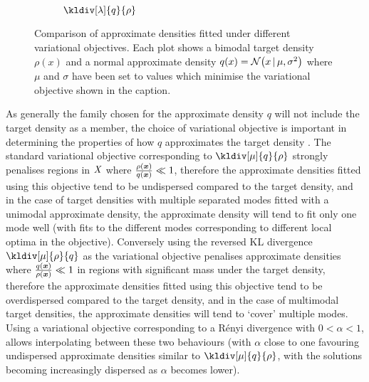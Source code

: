 \begin{figure}[t]
\begin{subfigure}[b]{.32\linewidth}
\caption{$\kldiv[\lambda]{q}{\rho}$}
\label{sfig:var-obj-kl-qp}
\end{subfigure}
\caption[Variational objective comparison.]{Comparison of approximate densities fitted under different variational objectives. Each plot shows a bimodal target density $\rho(x)$ and a normal approximate density $q(x) = \nrm{x \gvn \mu,\sigma^2}$ where $\mu$ and $\sigma$ have been set to values which minimise the variational objective shown in the caption.}
\label{fig:variational-objective-comparison}
\end{figure}

As generally the family chosen for the approximate density $q$ will not include the target density as a member, the choice of variational objective is important in determining the properties of how $q$ approximates the target density \citep{bishop2006pattern}. The standard variational objective corresponding to $\kldiv[\mu]{q}{\rho}$ strongly penalises regions in $\mathit{X}$ where $\frac{\rho(\boldsymbol{x})}{q(\boldsymbol{x})} \ll  1$, therefore the approximate densities fitted using this objective tend to be undispersed compared to the target density, and in the case of target densities with multiple separated modes fitted with a unimodal approximate density, the approximate density will tend to fit only one mode well (with fits to the different modes corresponding to different local optima in the objective). Conversely using the reversed \ac{KL} divergence $\kldiv[\mu]{\rho}{q}$ as the variational objective penalises approximate densities where $\frac{q(\boldsymbol{x})}{\rho(\boldsymbol{x})} \ll 1$ in regions with significant mass under the target density, therefore the approximate densities fitted using this objective tend to be overdispersed compared to the target density, and in the case of multimodal target densities, the approximate densities will tend to `cover' multiple modes. Using a variational objective corresponding to a R\'{e}nyi divergence with $0 < \alpha < 1$, allows interpolating between these two behaviours (with $\alpha$ close to one favouring undispersed approximate densities similar to $\kldiv[\mu]{q}{\rho}$, with the solutions becoming increasingly dispersed as $\alpha$ becomes lower). 

